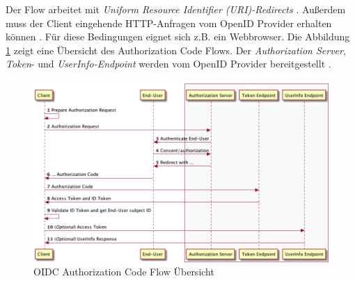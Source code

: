 
Der Flow arbeitet mit \textit{Uniform Resource Identifier (URI)-Redirects} \cite{EB12}. Außerdem muss der Client eingehende HTTP-Anfragen vom OpenID Provider erhalten können \cite{EB12}. Für diese Bedingungen eignet sich z.B. ein Webbrowser. Die Abbildung \ref{fig:EB_AuthorizationCodeFlow} zeigt eine Übersicht des Authorization Code Flows. Der \textit{Authorization Server}, \textit{Token}- und \textit{UserInfo-Endpoint} werden vom OpenID Provider bereitgestellt \cite{EB12} \cite[Keycloak URI Endpoints]{keycloakDocs}.

\begin{figure}[!ht]
	\centering
	\includegraphics[width=1\textwidth]{Images/Ebert/AuthorizationCodeFlow.png}
	\caption{OIDC Authorization Code Flow Übersicht \cite{EB12}}
	\label{fig:EB_AuthorizationCodeFlow}
\end{figure} 

